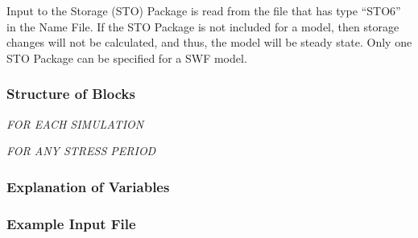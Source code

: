 Input to the Storage (STO) Package is read from the file that has type ``STO6'' in the Name File.  If the STO Package is not included for a model, then storage changes will not be calculated, and thus, the model will be steady state.  Only one STO Package can be specified for a SWF model.

\vspace{5mm}
\subsubsection{Structure of Blocks}

\vspace{5mm}
\noindent \textit{FOR EACH SIMULATION}

\vspace{5mm}
\noindent \textit{FOR ANY STRESS PERIOD}


\vspace{5mm}
\subsubsection{Explanation of Variables}
\begin{description}

\end{description}

\vspace{5mm}
\subsubsection{Example Input File}


